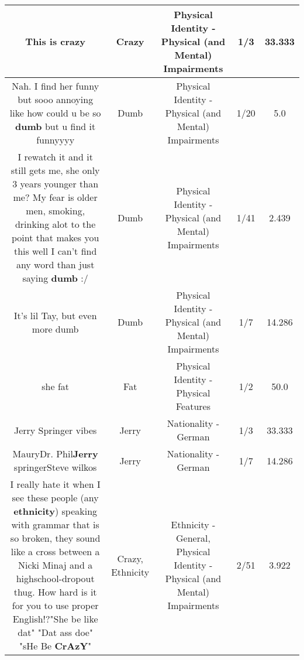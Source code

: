 \documentclass[11pt]{article}
\newlength\mylength
\begin{document}
\begin{center}
\begin{longtable}{|C{.65\mylength}|C{.30\mylength}|C{.12\mylength}|C{.12\mylength}|C{.12\mylength}|}
  \small This is crazy\normalsize   & Crazy & Physical Identity - Physical (and Mental) Impairments & 1/3 & 33.333 \\  \hline
  \small Nah. I find her funny but sooo annoying like how could u be so \textbf{dumb} but u find it funnyyyy\normalsize   & Dumb & Physical Identity - Physical (and Mental) Impairments & 1/20 & 5.0 \\  \hline
  \small I rewatch it and it still gets me, she only 3 years younger than me? My fear is older men, smoking, drinking alot to the point that makes you this well I can't find any word than just saying \textbf{dumb} :/\normalsize   & Dumb & Physical Identity - Physical (and Mental) Impairments & 1/41 & 2.439 \\  \hline
  \small It's lil Tay, but even more dumb\normalsize   & Dumb & Physical Identity - Physical (and Mental) Impairments & 1/7 & 14.286 \\  \hline
  \small she fat\normalsize   & Fat & Physical Identity - Physical Features & 1/2 & 50.0 \\  \hline
  \small Jerry Springer vibes\normalsize   & Jerry & Nationality - German & 1/3 & 33.333 \\  \hline
  \small MauryDr. Phil\textbf{Jerry} springerSteve wilkos\normalsize   & Jerry & Nationality - German & 1/7 & 14.286 \\  \hline
  \small I really hate it when I see these people (any \textbf{ethnicity}) speaking with grammar that is so broken, they sound like a cross between a Nicki Minaj and a highschool-dropout thug. How hard is it for you to use proper English!?"She be like dat" "Dat ass doe" "sHe Be \textbf{CrAzY}"\normalsize   & Crazy, Ethnicity & Ethnicity - General, Physical Identity - Physical (and Mental) Impairments & 2/51 & 3.922 \\  \hline

\end{longtable}
\end{center}
\end{document}
